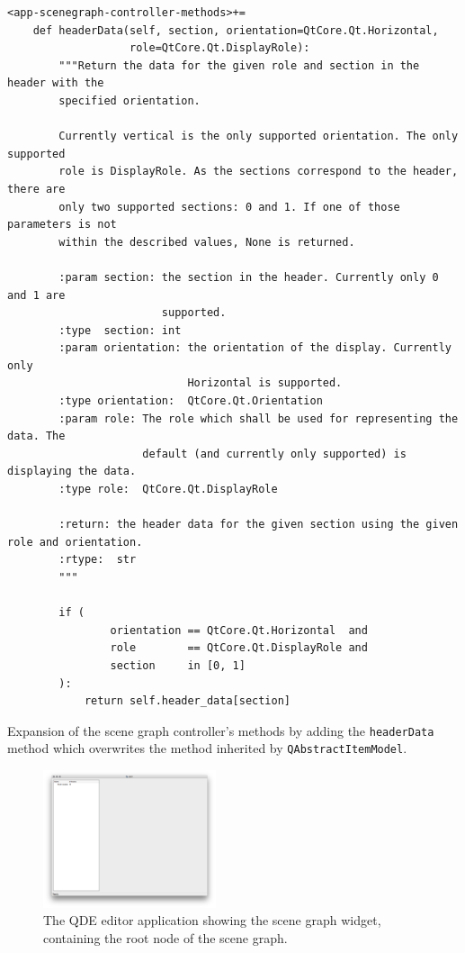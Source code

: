 \documentclass[10pt, openright, notitlepage]{scrreprt}
\begin{document}
\begin{listing}[H]
\begin{verbatim}
<app-scenegraph-controller-methods>+=
    def headerData(self, section, orientation=QtCore.Qt.Horizontal,
                   role=QtCore.Qt.DisplayRole):
        """Return the data for the given role and section in the header with the
        specified orientation.
    
        Currently vertical is the only supported orientation. The only supported
        role is DisplayRole. As the sections correspond to the header, there are
        only two supported sections: 0 and 1. If one of those parameters is not
        within the described values, None is returned.
    
        :param section: the section in the header. Currently only 0 and 1 are
                        supported.
        :type  section: int
        :param orientation: the orientation of the display. Currently only
                            Horizontal is supported.
        :type orientation:  QtCore.Qt.Orientation
        :param role: The role which shall be used for representing the data. The
                     default (and currently only supported) is displaying the data.
        :type role:  QtCore.Qt.DisplayRole
    
        :return: the header data for the given section using the given role and orientation.
        :rtype:  str
        """
    
        if (
                orientation == QtCore.Qt.Horizontal  and
                role        == QtCore.Qt.DisplayRole and
                section     in [0, 1]
        ):
            return self.header_data[section]
\end{verbatim}
\caption{\label{lst:app-scenegraph-controller-methods-header-data}
Expansion of the scene graph controller's methods by adding the \texttt{headerData} method which overwrites the method inherited by \texttt{QAbstractItemModel}.}
\end{listing}

\begin{figure}[H]
\centering
\includegraphics[width=2in]{./images/qde_alpha_03.png}
\caption{\label{fig:editor-alpha-03}
The QDE editor application showing the scene graph widget, containing the root node of the scene graph.}
\end{figure}
\end{document}

